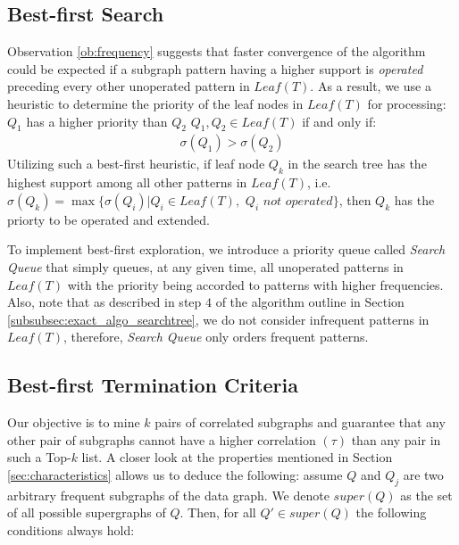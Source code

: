 \subsection{Best-first Search}
\label{subsubsec:exact_algo_bestfs}
Observation \ref{ob:frequency} suggests that faster convergence of the algorithm
could be expected if a subgraph pattern having a higher support is
\textit{operated} preceding every other unoperated pattern in $Leaf(T)$. As a result, we
use a heuristic to determine the priority of the leaf nodes in $Leaf(T)$
for processing: $Q_1$ has a higher priority than $Q_2$ \forall $Q_1, Q_2 \in Leaf(T)$ if and only if:
\begin{align*}\sigma(Q_1)>\sigma(Q_2)\end{align*}
Utilizing such a best-first heuristic, if leaf node $Q_k$ in the search tree has
the highest support among all other patterns in $Leaf(T)$, i.e. $\sigma(Q_k)=\max\{\sigma(Q_i)|Q_i\in Leaf(T),$ $Q_i$ $not$ $operated\}$, 
then $Q_k$ has the priorty to be operated and extended.
\par To implement best-first exploration, we introduce a priority queue called \textit{Search Queue} that simply queues,
 at any given time, all unoperated patterns in $Leaf(T)$ with the priority being accorded to patterns with higher frequencies. Also,
 note that as described in step $4$ of the algorithm outline in Section \ref{subsubsec:exact_algo_searchtree}, we do not consider 
 infrequent patterns in $Leaf(T)$, therefore, \textit{Search Queue} only orders frequent patterns. 

\subsection{Best-first Termination Criteria}
\label{subsubsec:exact_algo_ceasing}
Our objective is to mine $k$ pairs of correlated subgraphs and guarantee that any other pair of subgraphs cannot have a higher correlation $(\tau)$ than any pair in such a {\sf Top-$k$} list. 
A closer look at the properties mentioned in Section \ref{sec:characteristics} allows us to deduce the following: 
assume $Q$ and $Q_j$ are two arbitrary frequent subgraphs of the data graph. 
We denote $super(Q)$ as the set of all possible supergraphs of $Q$. Then, for all $Q'\in super(Q)$ the following conditions always hold:

